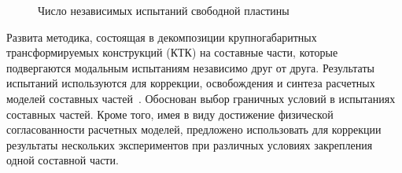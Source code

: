 \begin{figure}[!htb]
\begin{minipage}[b]{0.49\textwidth}
		\caption{Число независимых испытаний свободной пластины} \label{fig:perturbation-plate-samplesize}
	\end{minipage}
\end{figure}

Развита методика, состоящая в декомпозиции крупногабаритных трансформируемых конструкций (КТК) на составные части, которые подвергаются модальным испытаниям независимо друг от друга. Результаты испытаний используются для коррекции, освобождения и синтеза расчетных моделей составных частей~. Обоснован выбор граничных условий в испытаниях составных частей. Кроме того, имея в виду достижение физической согласованности расчетных моделей, предложено использовать для коррекции результаты нескольких экспериментов при различных условиях закрепления одной составной части.


